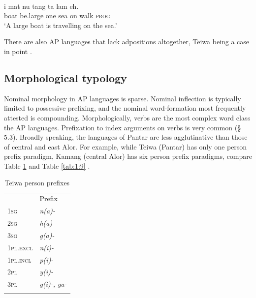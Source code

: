 {\ea%
\label{ex:1:32}
\\
\gll 
{\textepsilon}i  mat{\textepsilon}  nu  tang  ta  lam{\textepsilon} eh.  \\
 boat  be.large  one  sea  on  walk  \textsc{prog}   \\
\glt `A large boat is travelling on the sea.'
\z

 
There are also AP languages that lack adpositions altogether, Teiwa being a case in point \citep{Klamer2010grammar}. 

\subsection{Morphological typology} \label{sec:1:5.7}
Nominal morphology in AP languages is sparse. Nominal inflection is typically limited to possessive prefixing, and the nominal word-formation most frequently attested is compounding. Morphologically, verbs are the most complex word class the AP languages. Prefixation to index arguments on verbs is very common ({\S} 5.3). Broadly speaking, the languages of Pantar are less agglutinative than those of central and east Alor. For example, while Teiwa (Pantar) has only one person prefix paradigm, Kamang (central Alor) has six person prefix paradigms, compare Table \ref{tab:1:8} and Table \ref{tab:1:9} \citep{FeddenBrownTV}. 
 

\begin{table}\centering


\begin{tabular}{ll} & Prefix\\
\mytoprule
{\scshape 1sg} & {\itshape n(a)-}\\
{\scshape 2sg} & {\itshape h(a)-}\\
{\scshape 3sg} & {\itshape g(a)-}\\
{\scshape 1pl.excl} & {\itshape n(i)-}\\
{\scshape 1pl.incl} & {\itshape p(i)-}\\
{\scshape 2pl} & {\itshape y(i)-}\\
{\scshape 3pl} & {\itshape g(i)-, ga-}\\
\mybottomrule
\end{tabular}

\caption{Teiwa person prefixes \citep[77,78]{Klamer2010grammar}}
\label{tab:1:8}
\end{table}

 

}
